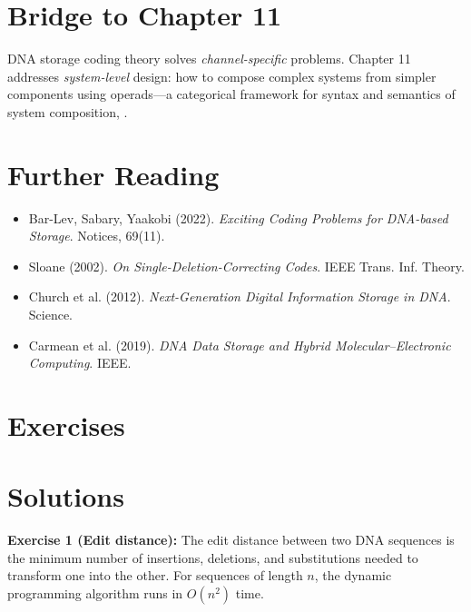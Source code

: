 \section{Bridge to Chapter 11}
\label{sec:dna:bridge}

DNA storage coding theory solves \emph{channel-specific} problems. Chapter 11 addresses \emph{system-level} design: how to compose complex systems from simpler components using operads---a categorical framework for syntax and semantics of system composition, \cite{barlev2022dna}.

\section{Further Reading}
\label{sec:dna:refs}

\begin{itemize}
    \item Bar-Lev, Sabary, Yaakobi (2022). \textit{Exciting Coding Problems for DNA-based Storage}. Notices, 69(11).
    \item Sloane (2002). \textit{On Single-Deletion-Correcting Codes}. IEEE Trans. Inf. Theory.
    \item Church et al. (2012). \textit{Next-Generation Digital Information Storage in DNA}. Science.
    \item Carmean et al. (2019). \textit{DNA Data Storage and Hybrid Molecular–Electronic Computing}. IEEE.
\end{itemize}

\section{Exercises}
\section{Solutions}
\label{sec:dna:solutions}

\begin{solution}
\textbf{Exercise 1 (Edit distance):} The edit distance between two DNA sequences is the minimum number of insertions, deletions, and substitutions needed to transform one into the other. For sequences of length $n$, the dynamic programming algorithm runs in $O(n^2)$ time.
\end{solution}


